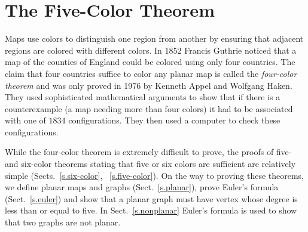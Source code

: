 

\chapter{The Five-Color Theorem}\label{c.five}




Maps use colors to distinguish one region from another by ensuring that adjacent regions are colored with different colors. In 1852 Francis Guthrie noticed that a map of the counties of England could be colored using only four countries. The claim that four countries suffice to color any planar map is called the \emph{four-color theorem} and was only proved in 1976 by Kenneth Appel and Wolfgang Haken. They used sophisticated mathematical arguments to show that if there is a counterexample (a map needing more than four colors) it had to be associated with one of $1834$ configurations. They then used a computer to check these configurations.

While the four-color theorem is extremely difficult to prove, the proofs of five- and six-color theorems stating that five or six colors are sufficient are relatively simple (Sects.~\ref{s.six-color}, ~\ref{s.five-color}). On the way to proving these theorems, we define planar maps and graphs (Sect.~\ref{s.planar}), prove Euler's formula (Sect.~\ref{s.euler}) and show that a planar graph must have vertex whose degree is less than or equal to five. In Sect.~\ref{s.nonplanar} Euler's formula is used to show that two graphs are not planar.

